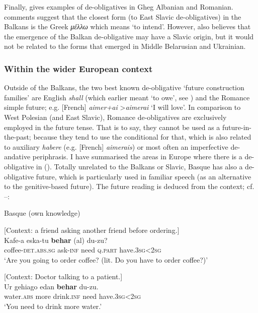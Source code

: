 \documentclass[output=paper,colorlinks,citecolor=brown]{langscibook}
\begin{document}
Finally, \citet[323]{Dahl2000b} gives examples of de-obligatives in Gheg Albanian and Romanian.  comments suggest that the closest form (to East Slavic de-obligatives) in the Balkans is the Greek \textit{μέλλω} which means ‘to intend’. However, \citet[164--167, 177]{Danylenko2011} also believes that the emergence of the Balkan de-obligative may have a Slavic origin, but it would not be related to the forms that emerged in Middle Belarusian and Ukrainian.

\subsubsection{Within the wider European context}

Outside of the Balkans, the two best known de-obligative ‘future construction families’ are English \textit{shall} (which earlier meant ‘to owe’, see \citealt[194]{Bybee1985}) and the Romance simple future; e.g. [French] \textit{aimer+ai }>\textit{aimerai} ‘I will love’. In comparison to West Polesian (and East Slavic), Romance de-obligatives are exclusively employed in the future tense. That is to say, they cannot be used as a future-in-the-past; because they tend to use the conditional for that, which is also related to auxiliary \textit{habere} (e.g. [French] \textit{aimerais}) or most often an imperfective de-andative periphrasis. I have summarised the areas in Europe where there is a de-obligative in (). Totally unrelated to the Balkans or Slavic, Basque has also a de-obligative future, which is particularly used in familiar speech (as an alternative to the genitive-based future). The future reading is deduced from the context; cf. --:

\ea \label{ex:roncero:20}
    Basque (own knowledge)
    
    [Context: a friend asking another friend before ordering.]\\
    \gll Kafe-a eska-tu \textbf{behar} (al) du-zu?\\
    coffee-\textsc{det.abs.sg} ask-\textsc{inf} need \textsc{q.part} have.\textsc{3sg<2sg}\\
    \glt ‘Are you going to order coffee? (lit. Do you have to order coffee?)’
\z

\ea \label{ex:roncero:21}
    [Context: Doctor talking to a patient.]\\
    \gll Ur gehiago edan  \textbf{behar} du-zu.\\
    water.\textsc{abs} more drink.\textsc{inf} need have.\textsc{3sg<2sg}\\
    \glt ‘You need to drink more water.’
\z
\end{document}
